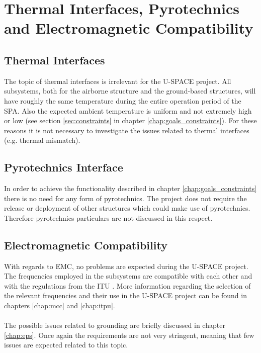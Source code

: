 \chapter{Thermal Interfaces, Pyrotechnics and Electromagnetic Compatibility}
\label{chap:thermal_pyro_emc}

\section{Thermal Interfaces}

The topic of thermal interfaces is irrelevant for the \ac{U-SPACE} project. All subsystems, both for the airborne structure and the ground-based structures, will have roughly the same temperature during the entire operation period of the \ac{SPA}. Also the expected ambient temperature is uniform and not extremely high or low (see section \ref{sec:constraints} in chapter \ref{chap:goals_constraints}). For these reasons it is not necessary to investigate the issues related to thermal interfaces (e.g. thermal mismatch).

\section{Pyrotechnics Interface}

In order to achieve the functionality described in chapter \ref{chap:goals_constraints} there is no need for any form of pyrotechnics. The project does not require the release or deployment of other structures which could make use of pyrotechnics. Therefore pyrotechnics particulars are not discussed in this respect.

\section{Electromagnetic Compatibility}

With regards to \ac{EMC}, no problems are expected during the \ac{U-SPACE} project. The frequencies employed in the subsystems are compatible with each other and with the regulations from the \ac{ITU} \cite{book:freqalloc}. More information regarding the selection of the relevant frequencies and their use in the \ac{U-SPACE} project can be found in chapters \ref{chap:mcc} and \ref{chap:itpu}.
\\
\\
The possible issues related to grounding are briefly discussed in chapter \ref{chap:eps}. Once again the requirements are not very stringent, meaning that few issues are expected related to this topic.